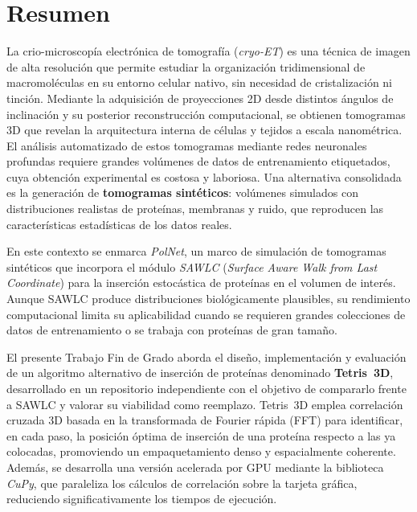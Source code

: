 

\chapter*{Resumen}

La crio-microscopía electrónica de tomografía (\textit{cryo-ET}) es una técnica de imagen de alta
resolución que permite estudiar la organización tridimensional de macromoléculas en su entorno
celular nativo, sin necesidad de cristalización ni tinción. Mediante la adquisición de
proyecciones 2D desde distintos ángulos de inclinación y su posterior reconstrucción
computacional, se obtienen tomogramas 3D que revelan la arquitectura interna de células y tejidos
a escala nanométrica. El análisis automatizado de estos tomogramas mediante redes neuronales
profundas requiere grandes volúmenes de datos de entrenamiento etiquetados, cuya obtención
experimental es costosa y laboriosa. Una alternativa consolidada es la generación de
\textbf{tomogramas sintéticos}: volúmenes simulados con distribuciones realistas de proteínas,
membranas y ruido, que reproducen las características estadísticas de los datos reales.

En este contexto se enmarca \textit{PolNet}, un marco de simulación de tomogramas sintéticos que
incorpora el módulo \textit{SAWLC} (\textit{Surface Aware Walk from Last Coordinate}) para la
inserción estocástica de proteínas en el volumen de interés. Aunque SAWLC produce distribuciones
biológicamente plausibles, su rendimiento computacional limita su aplicabilidad cuando se
requieren grandes colecciones de datos de entrenamiento o se trabaja con proteínas de gran tamaño.

El presente Trabajo Fin de Grado aborda el diseño, implementación y evaluación de un algoritmo
alternativo de inserción de proteínas denominado \textbf{Tetris~3D}, desarrollado en un repositorio
independiente con el objetivo de compararlo frente a SAWLC y valorar su viabilidad como reemplazo.
Tetris~3D emplea correlación cruzada 3D basada en la transformada de Fourier rápida (FFT) para
identificar, en cada paso, la posición óptima de inserción de una proteína respecto a las ya
colocadas, promoviendo un empaquetamiento denso y espacialmente coherente. Además, se desarrolla
una versión acelerada por GPU mediante la biblioteca \textit{CuPy}, que paraleliza los cálculos de
correlación sobre la tarjeta gráfica, reduciendo significativamente los tiempos de ejecución.

